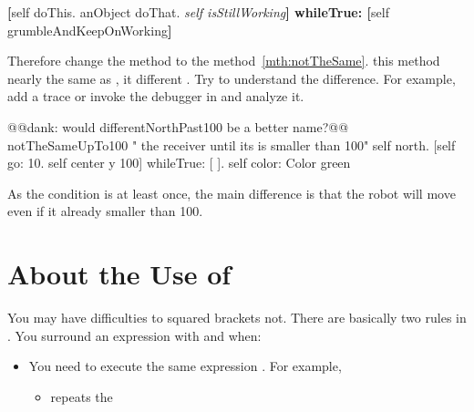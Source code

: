 {{{
\begin{template}
\textbf{[}self doThis.
anObject doThat.
\emph{self isStillWorking}\textbf{] whileTrue: 
   [}self grumbleAndKeepOnWorking\textbf{]}
\end{template}

Therefore  change the method  to  the method~\ref{mth:notTheSame}. 
this method  nearly the same as  , it  different . Try to understand  the difference. For example, add a trace or invoke the debugger in  and analyze it. 

\begin{method}\label{mth:notTheSame}
@@dank: would differentNorthPast100 be a better name?@@
notTheSameUpTo100
   " the receiver  until its  is smaller than 100"
   self north.
   [self go: 10.
   self center y \replace{>}{>=} 100]
      whileTrue: [ ].
   self color: Color green
\end{method}

As the condition is  at least  once, the main difference is that the robot will move even if it  already   smaller than 100.  

\section{About the Use of \ct{[]}}\label{sec:useOfparent}
You may have difficulties  to  squared brackets \ct{[]}  not. 
There are basically two rules in \sq. You surround an expression  with \ct{[} and \ct{]} when:  

\begin{itemize}
\item You need to execute  the same expression . For example, 
\begin{itemize}
\item {} repeats  the  


\end{itemize}
\end{itemize}}}}
